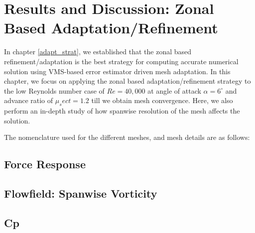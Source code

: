 \chapter{Results and Discussion: Zonal Based Adaptation/Refinement}

In chapter \ref{adapt_strat}, we established that the zonal based refinement/adaptation is the best strategy for computing accurate numerical solution using VMS-based error estimator driven mesh adaptation. In this chapter, we focus on applying the zonal based adaptation/refinement strategy to the low Reynolds number case of $Re=40,000$ at angle of attack $\alpha=6^\circ$ and advance ratio of $\mu_sect=1.2$ till we obtain mesh convergence. Here, we also perform an in-depth study of how spanwise resolution of the mesh affects the solution.

The nomenclature used for the different meshes, and mesh details are as follows:



\section{Force Response}

\label{sec:zonal_force_response}

\section{Flowfield: Spanwise Vorticity}

\label{sec:zonal_vorticity}

\section{Cp}

\label{sec:zonal_cp}